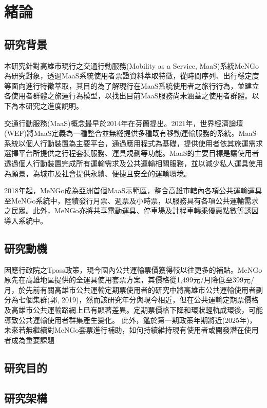 \chapter{緒論}\label{ux7dd2ux8ad6}

\section{研究背景}\label{ux7814ux7a76ux80ccux666f}

本研究針對高雄市現行之交通行動服務(Mobility as a Service,
MaaS)系統MeNGo為研究對象，透過MaaS系統使用者票證資料萃取特徵，從時間序列、出行穩定度等面向進行特徵萃取，其目的為了解現行在MaaS系統使用者之旅行行為，並建立各使用者群體之旅運行為模型，以找出目前MaaS服務尚未涵蓋之使用者群體。以下為本研究之進度說明。

交通行動服務(MaaS)概念最早於2014年在芬蘭提出。2021年，世界經濟論壇(WEF)將MaaS定義為一種整合並無縫提供多種既有移動運輸服務的系統。MaaS系統以個人行動裝置為主要平台，通過應用程式為基礎，提供使用者依其旅運需求選擇平台所提供之行程套裝服務、運具規劃等功能。MaaS的主要目標是讓使用者透過個人行動裝置完成所有運輸需求及公共運輸相關服務，並以減少私人運具使用為願景，為城市及社會提供永續、便捷且安全的運輸環境。

2018年起，MeNGo成為亞洲首個MaaS示範區，整合高雄市轄內各項公共運輸運具至MeNGo系統中，陸續發行月票、週票及小時票，以服務具有各項公共運輸需求之民眾。此外，MeNGo亦將共享電動運具、停車場及計程車轉乘優惠點數等誘因導入系統中。

\section{研究動機}\label{ux7814ux7a76ux52d5ux6a5f}

因應行政院之Tpass政策，現今國內公共運輸票價獲得較以往更多的補貼。MeNGo原先在高雄地區提供的全運具使用套票方案，其價格從1,499元/月降低至399元/月，於先前有關高雄市公共運輸定期票使用者的研究中將高雄市公共運輸使用者劃分為七個集群(郭,
2019)，然而該研究年分與現今相近，但在公共運輸定期票價格及高雄市公共運輸路網上已有顯著差異。定期票價格下降和環狀輕軌成環後，可能導致公共運輸使用者群集產生變化。
此外，鑑於第一期政策年期將近(2025年)，未來若無繼續對MeNGo套票進行補助，如何持續維持現有使用者或開發潛在使用者成為重要課題

\section{研究目的}\label{ux7814ux7a76ux76eeux7684}

\section{研究架構}\label{ux7814ux7a76ux67b6ux69cb}